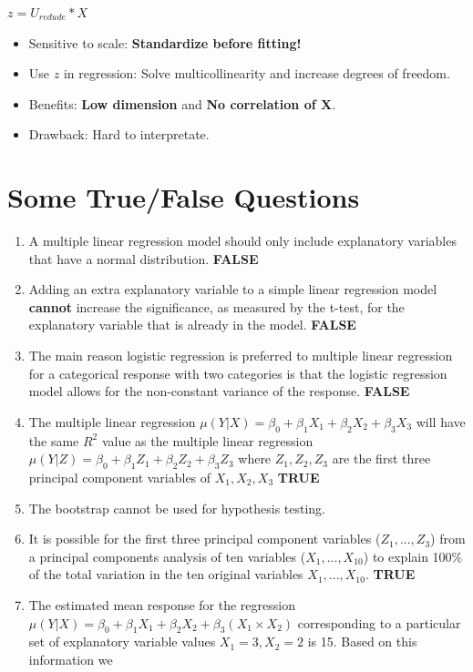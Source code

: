 \documentclass[10pt,landscape, fleqn]{article}
\begin{document}
\begin{multicols}{3}
\begin{center}
			\end{center}		
			$z = U_{redude} * X$
				\begin{itemize}
					\item Sensitive to scale: \textbf{Standardize before fitting!}
					\item Use $z$ in regression: Solve multicollinearity and increase degrees of freedom.
					\item Benefits: \textbf{Low dimension} and \textbf{No correlation of X}.
					\item Drawback: Hard to interpretate.
				\end{itemize}
				
		\section{Some True/False Questions}
			\begin{enumerate}
				\item A multiple linear regression model should only include explanatory variables that have a normal distribution. \textbf{FALSE}
				\item Adding an extra explanatory variable to a simple linear regression model \textbf{cannot} increase the significance, as measured by the t-test, for the explanatory	variable that is already in the model. \textbf{FALSE}
				\item  The main reason logistic regression is preferred to multiple linear regression for a categorical response with two categories is that the logistic regression model allows for the non-constant variance of the response. \textbf{FALSE}
				\item The multiple linear regression $\mu (Y | X ) = \beta_0 + \beta_1X_1 + \beta_2 X_2 + \beta_3X_3$ 	will have the same $R^2$ value as the multiple linear regression $\mu (Y | Z ) = \beta_0 + \beta_1Z_1 + \beta_2 Z_2 + \beta_3Z_3$ where $Z_1, Z_2, Z_3$ are the first three principal component variables of $X_1, X_2, X_3$ \textbf{TRUE}
				\item The bootstrap cannot be used for hypothesis testing. 
				\item It is possible for the first three principal component variables ($Z_1,..., Z_3$) from a principal components analysis of ten variables ($X_1 ,..., X_10$) to explain 100\% of the total variation in the ten original variables $X_1 ,..., X_10$. \textbf{TRUE}
				\item The estimated mean response for the regression $\mu (Y | X ) = \beta_0 + \beta_1X_1 + \beta_2 X_2 + \beta_3(X_1\times X_2)$ corresponding to a particular set of explanatory variable values $X_1 =3, X_2 = 2$ is 15. Based on this information we

\end{enumerate}
\end{multicols}
\end{document}
